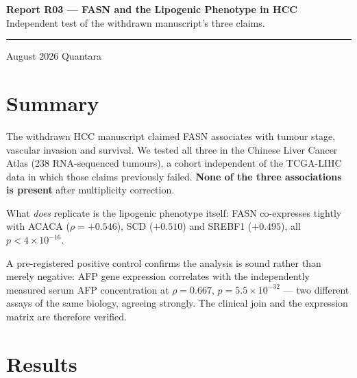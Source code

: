 \documentclass[11pt,a4paper]{article}
\begin{document}
\thispagestyle{empty}
\noindent
{\large\bfseries\color{qnavy} Report R03 --- FASN and the Lipogenic Phenotype in HCC}\\[2pt]
{\color{qgrey}Independent test of the withdrawn manuscript's three claims.}\\[6pt]
{\color{qgrey}\rule{\textwidth}{0.4pt}}

\medskip
{} August 2026 \quad\textbullet\quad Quantara

\section*{Summary}

The withdrawn HCC manuscript claimed FASN associates with tumour stage, vascular invasion
and survival. We tested all three in the Chinese Liver Cancer Atlas (238 RNA-sequenced
tumours), a cohort independent of the TCGA-LIHC data in which those claims previously
failed. \textbf{None of the three associations is present} after multiplicity correction.

What \emph{does} replicate is the lipogenic phenotype itself: FASN co-expresses tightly with
ACACA ($\rho=+0.546$), SCD ($+0.510$) and SREBF1 ($+0.495$), all $p<4\times10^{-16}$.

A pre-registered positive control confirms the analysis is sound rather than merely
negative: AFP gene expression correlates with the independently measured serum AFP
concentration at $\rho=0.667$, $p=5.5\times10^{-32}$ --- two different assays of the same
biology, agreeing strongly. The clinical join and the expression matrix are therefore
verified.

\section{Results}
\end{document}
